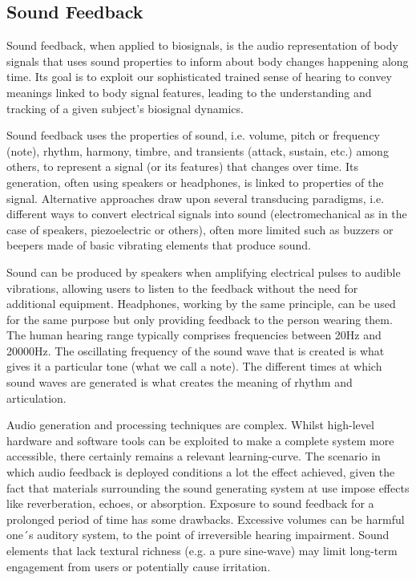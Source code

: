 \subsection*{Sound Feedback}

Sound feedback, when applied to biosignals, is the audio representation of body signals that uses sound properties to inform about body changes happening along time. Its goal is to exploit our sophisticated trained sense of hearing to convey meanings linked to body signal features, leading to the understanding and tracking of a given subject’s biosignal dynamics.

Sound feedback uses the properties of sound, i.e. volume, pitch or frequency (note), rhythm, harmony, timbre, and transients (attack, sustain, etc.) among others, to represent a signal (or its features) that changes over time. Its generation, often using speakers or headphones, is linked to properties of the signal. Alternative approaches draw upon several transducing paradigms, i.e. different ways to convert electrical signals into sound (electromechanical as in the case of speakers, piezoelectric or others), often more limited such as buzzers or beepers made of basic vibrating elements that produce sound.

Sound can be produced by speakers when amplifying electrical pulses to audible vibrations, allowing users to listen to the feedback without the need for additional equipment. Headphones, working by the same principle, can be used for the same purpose but only providing feedback to the person wearing them. The human hearing range typically comprises frequencies between 20Hz and 20000Hz. The oscillating frequency of the sound wave that is created is what gives it a particular tone (what we call a note). The different times at which sound waves are generated is what creates the meaning of rhythm and articulation.

Audio generation and processing techniques are complex. Whilst high-level hardware and software tools can be exploited to make a complete system more accessible, there certainly remains a relevant learning-curve. The scenario in which audio feedback is deployed conditions a lot the effect achieved, given the fact that materials surrounding the sound generating system at use impose effects like reverberation, echoes, or absorption. Exposure to sound feedback for a prolonged period of time has some drawbacks. Excessive volumes can be harmful one´s auditory system, to the point of irreversible hearing impairment. Sound elements that lack textural richness (e.g. a pure sine-wave) may limit long-term engagement from users or potentially cause irritation.

